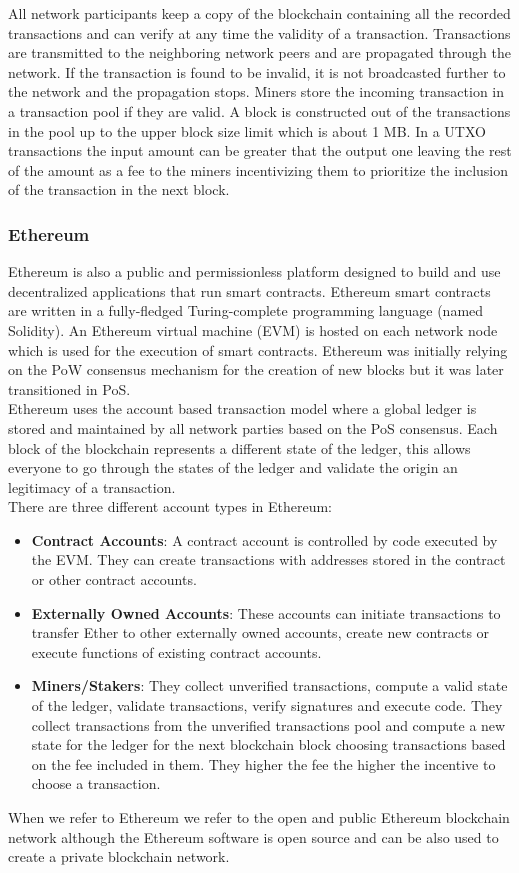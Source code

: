 All network participants keep a copy of the blockchain containing all the recorded transactions and can verify at any time the validity of a transaction.
Transactions are transmitted to the neighboring network peers and are propagated through the network. If the transaction is found to be invalid, it is not broadcasted further to the network and the propagation
stops. Miners store the incoming transaction in a transaction pool if they are valid. A block is constructed out of the transactions in the pool up to the upper block size limit which is about 1 MB. In a UTXO
transactions the input amount can be greater that the output one leaving the rest of the amount as a fee to the miners incentivizing them to prioritize the inclusion of the transaction in the next block.
\cite{blockchainTech,wang2017novel,Nakamoto,UTXOvsACCOUNT}

\subsubsection{Ethereum}
Ethereum is also a public and permissionless platform designed to build and use decentralized applications that run smart contracts. Ethereum smart contracts are written in a fully-fledged Turing-complete programming
language (named Solidity). An Ethereum virtual machine (EVM) is hosted on each network node which is used for the execution of smart contracts. Ethereum was initially relying on the PoW consensus mechanism for the creation of new blocks but it was
later transitioned in PoS.\\
Ethereum uses the account based transaction model where a global ledger is stored and maintained by all network parties based on the PoS consensus. Each block of the blockchain represents a different state of the ledger, this
allows everyone to go through the states of the ledger and validate the origin an legitimacy of a transaction.\\
There are three different account types in Ethereum:
\begin{itemize}
    \item \textbf{Contract Accounts}: A contract account is controlled by code executed by the EVM. They can create transactions with addresses stored in the contract or other contract accounts.
    \item \textbf{Externally Owned Accounts}: These accounts can initiate transactions to transfer Ether to other externally owned accounts, create new contracts or execute functions of existing contract accounts.
    \item \textbf{Miners/Stakers}: They collect unverified transactions, compute a valid state of the ledger, validate transactions, verify signatures and execute code. They collect transactions from the unverified transactions
          pool and compute a new state for the ledger for the next blockchain block choosing transactions based on the fee included in them. They higher the fee the higher the incentive to choose a transaction.
\end{itemize}
When we refer to Ethereum we refer to the open and public Ethereum blockchain network although the Ethereum software is open source and can be also used to create a private blockchain network.
\cite{blockchainTech,ethereum,UTXOvsACCOUNT}

